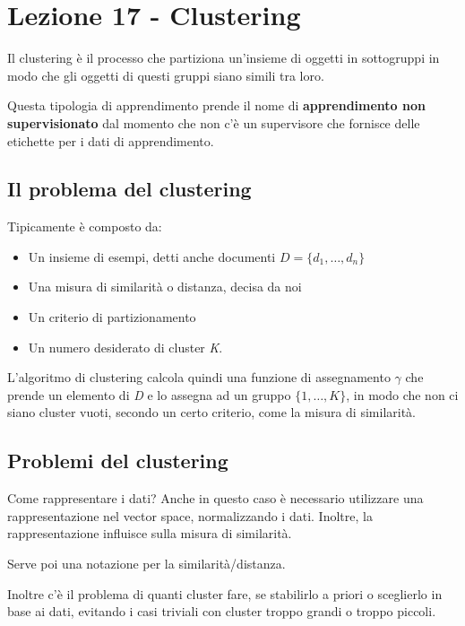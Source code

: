 \section{Lezione 17 - Clustering}\label{lezione-17---clustering}

Il clustering è il processo che partiziona un'insieme di oggetti in
sottogruppi in modo che gli oggetti di questi gruppi siano simili tra
loro.

Questa tipologia di apprendimento prende il nome di
\textbf{apprendimento non supervisionato} dal momento che  non c'è un supervisore che fornisce delle etichette per i dati di apprendimento.

\subsection{Il problema del clustering}\label{il-problema-del-clustering}

Tipicamente è composto da:

\begin{itemize}
\item
  Un insieme di esempi, detti anche documenti $D = \{d_1, \ldots , d_n\}$
\item
  Una misura di similarità o distanza, decisa da noi
\item
  Un criterio di partizionamento
\item
  Un numero desiderato di cluster \emph{K}.
\end{itemize}

L'algoritmo di clustering calcola quindi una funzione di assegnamento $\gamma$
che prende un elemento di \emph{D} e lo assegna ad un gruppo
$\{1, \ldots , K\}$, in modo che non ci siano cluster vuoti, secondo un certo criterio, come la misura di similarità.

\subsection{Problemi del clustering}\label{problemi-del-clustering}

Come rappresentare i dati? Anche in questo caso è necessario utilizzare
una rappresentazione nel vector space, normalizzando i dati. Inoltre, la
rappresentazione influisce sulla misura di similarità.

Serve poi una notazione per la similarità/distanza.

Inoltre c'è il problema di quanti cluster fare, se stabilirlo a priori o
sceglierlo in base ai dati, evitando i casi triviali con cluster troppo
grandi o troppo piccoli.

